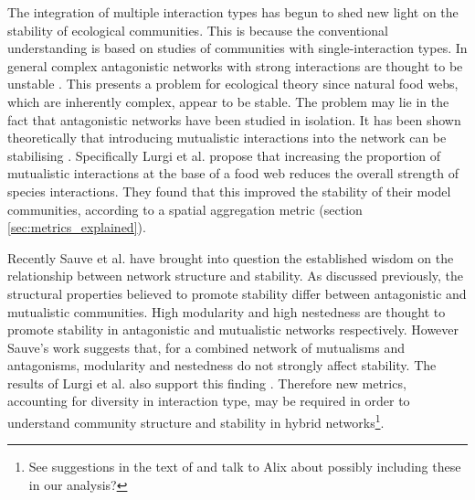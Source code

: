 The integration of multiple interaction types has begun to shed new light on the stability of ecological communities. This is because the conventional understanding is based on studies of communities with single-interaction types. In general complex antagonistic networks with strong interactions are thought to be unstable \cite{o2009perturbations}. This presents a problem for ecological theory since natural food webs, which are inherently complex, appear to be stable. The problem may lie in the fact that antagonistic networks have been studied in isolation. It has been shown theoretically that introducing mutualistic interactions into the network can be stabilising \cite{mougi2012diversity, lurgi2015effects}. Specifically Lurgi et al. \cite{lurgi2015effects} propose that increasing the proportion of mutualistic interactions at the base of a food web reduces the overall strength of species interactions. They found that this improved the stability of their model communities, according to a spatial aggregation metric (section \ref{sec:metrics_explained}). 

Recently Sauve et al. \cite{sauve2014structure} have brought into question the established wisdom on the relationship between network structure and stability. As discussed previously, the structural properties believed to promote stability differ between antagonistic and mutualistic communities. High modularity and high nestedness are thought to promote stability in antagonistic and mutualistic networks respectively. However Sauve's work suggests that, for a combined network of mutualisms and antagonisms, modularity and nestedness do not strongly affect stability. The results of Lurgi et al. also support this finding \cite{lurgi2015effects}. Therefore new metrics, accounting for diversity in interaction type, may be required in order to understand community structure and stability in hybrid networks\footnote{See suggestions in the text of \cite{sauve2014structure} and talk to Alix about possibly including these in our analysis?}.

